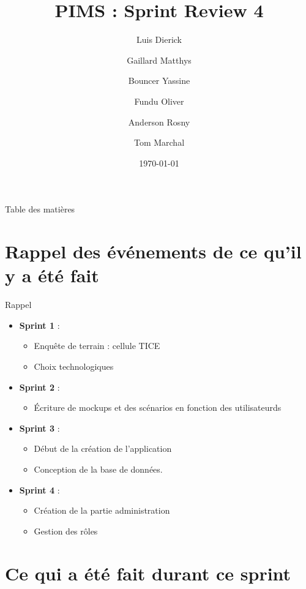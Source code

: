 \documentclass[numbering=fraction]{beamer}
\title{PIMS : Sprint Review 4}
\author[PIMS]{Luis Dierick \and Gaillard Matthys \and Bouncer Yassine \and Fundu Oliver \and Anderson Rosny \and Tom Marchal }
\institute{Université de Namur}
\date{\today}
\begin{document}
\begin{frame}[plain]{}
    \maketitle
\end{frame}

\begin{frame}{Table des matières}
    \tableofcontents
\end{frame}
\section{Rappel des événements de ce qu'il y a été fait}
\begin{frame}{Rappel}
    \begin{itemize}
        \item \textbf{Sprint 1} :
        \begin{itemize}
            \item Enquête de terrain : cellule TICE 
            \item Choix technologiques
        \end{itemize}
        \item \textbf{Sprint 2} : 
        \begin{itemize}
            \item Écriture de mockups et des scénarios en fonction des utilisateurds
        \end{itemize}
        \item \textbf{Sprint 3} :
        \begin{itemize}
            \item Début de la création de l'application
            \item Conception de la base de données.
        \end{itemize}
        \item \textbf{Sprint 4} :
        \begin{itemize}
            \item Création de la partie administration
            \item Gestion des rôles
        \end{itemize}
            
    \end{itemize}
\end{frame}
\section{Ce qui a été fait durant ce sprint}
\end{document}
